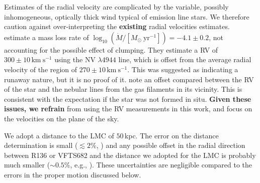 \documentclass[a4paper,fleqn,usenatbib]{mnras}
\newcommand{\newtext}[1]{{\color{ForestGreen}\bf{#1}}}
\newcommand{\kms}{{\,\mathrm{km\ s^{-1}}}}
\begin{document}
Estimates of the radial velocity are complicated by the variable,
possibly inhomogeneous, optically thick wind  typical of emission line
stars.  We therefore caution
against over-interpreting the \newtext{existing} radial velocities estimates. \citet{bestenlehner:11} estimate a mass loss rate of
$\log_{10}(\dot{M}/[M_\odot \ \mathrm{yr}^{-1}])=-4.1\pm0.2$, not accounting for the
possible effect of clumping.  %
They estimate a RV of
$300\pm10\kms$ using the  N{\footnotesize V} $\lambda4944$ line, which
is offset from the average radial velocity of the region of
$270\pm10\kms$. This was suggested as indicating a runaway nature, but
it is no proof of it. %
\cite{bressert:12} note an offset compared between the RV of
the star and the nebular lines from the gas filaments in its
vicinity. This is consistent with the expectation if the star was not
formed in situ. \newtext{Given these issues, we refrain} from using the RV measurements in this
work, and focus on the velocities on the plane of the sky. 

We adopt a distance to the LMC of $50$\,kpc. The error on
the distance determination is small ($\lesssim2\%$,
\citealt{pietrzynski:13}) and any possible offset in the radial
direction between R136 or VFTS682 and the distance we adopted for the
LMC is probably much smaller ($\sim$$0.5\%$, e.g., \citealt{luks:92}). These uncertainties are negligible compared to the errors in the proper motion discussed below.  
\end{document}
